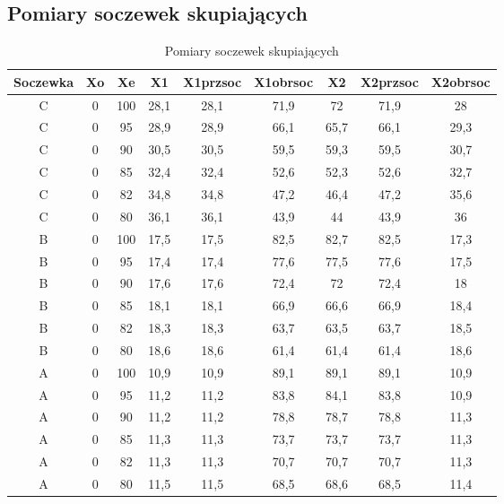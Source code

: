 \documentclass[polish,a4paper]{article}
\begin{document}
\subsection{Pomiary soczewek skupiających}
\begin{table}[H]
\centering
\begin{tabular}{|c|c|c|c|c|c|c|c|c|}
\hline
Soczewka &  Xo &  Xe &  X1 &  X1przsoc &  X1obrsoc &  X2 &  X2przsoc &  X2obrsoc \\
\hline
C &  0 &  100 &  28,1 &  28,1 &  71,9 &  72 &  71,9 &  28 \\
C &  0 &  95 &  28,9 &  28,9 &  66,1 &  65,7 &  66,1 &  29,3 \\
C &  0 &  90 &  30,5 &  30,5 &  59,5 &  59,3 &  59,5 &  30,7 \\
C &  0 &  85 &  32,4 &  32,4 &  52,6 &  52,3 &  52,6 &  32,7 \\
C &  0 &  82 &  34,8 &  34,8 &  47,2 &  46,4 &  47,2 &  35,6 \\
C &  0 &  80 &  36,1 &  36,1 &  43,9 &  44 &  43,9 &  36 \\
\hline
B &  0 &  100 &  17,5 &  17,5 &  82,5 &  82,7 &  82,5 &  17,3 \\
B &  0 &  95 &  17,4 &  17,4 &  77,6 &  77,5 &  77,6 &  17,5 \\
B &  0 &  90 &  17,6 &  17,6 &  72,4 &  72 &  72,4 &  18 \\
B &  0 &  85 &  18,1 &  18,1 &  66,9 &  66,6 &  66,9 &  18,4 \\
B &  0 &  82 &  18,3 &  18,3 &  63,7 &  63,5 &  63,7 &  18,5 \\
B &  0 &  80 &  18,6 &  18,6 &  61,4 &  61,4 &  61,4 &  18,6 \\
\hline
A &  0 &  100 &  10,9 &  10,9 &  89,1 &  89,1 &  89,1 &  10,9 \\
A &  0 &  95 &  11,2 &  11,2 &  83,8 &  84,1 &  83,8 &  10,9 \\
A &  0 &  90 &  11,2 &  11,2 &  78,8 &  78,7 &  78,8 &  11,3 \\
A &  0 &  85 &  11,3 &  11,3 &  73,7 &  73,7 &  73,7 &  11,3 \\
A &  0 &  82 &  11,3 &  11,3 &  70,7 &  70,7 &  70,7 &  11,3 \\
A &  0 &  80 &  11,5 &  11,5 &  68,5 &  68,6 &  68,5 &  11,4 \\
\hline
\end{tabular}
\caption{Pomiary soczewek skupiających}
\end{table}
\end{document}
